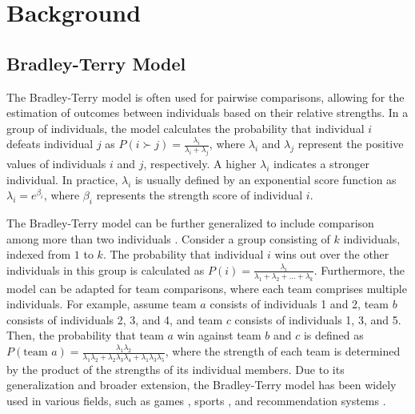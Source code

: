 \section{Background}
\label{sec:background}

\subsection{Bradley-Terry Model}
\label{subsec:bg_generalized_bt}
The Bradley-Terry model \citep{bradley_rank_1952} is often used for pairwise comparisons, allowing for the estimation of outcomes between individuals based on their relative strengths.
In a group of individuals, the model calculates the probability that individual $i$ defeats individual $j$ as $P(i \succ j) = \frac{\lambda_i}{\lambda_i+\lambda_j}$, where $\lambda_i$ and $\lambda_j$ represent the positive values of individuals $i$ and $j$, respectively.
A higher $\lambda_i$ indicates a stronger individual.
In practice, $\lambda_i$ is usually defined by an exponential score function as $\lambda_i=e^{\beta_i}$, where $\beta_i$ represents the strength score of individual $i$.

The Bradley-Terry model can be further generalized to include comparison among more than two individuals \citep{huang_generalized_2006}.
Consider a group consisting of $k$ individuals, indexed from $1$ to $k$.
The probability that individual $i$ wins out over the other individuals in this group is calculated as $P(i) = \frac{\lambda_i}{\lambda_1 + \lambda_2 + \ldots + \lambda_k}$.
Furthermore, the model can be adapted for team comparisons, where each team comprises multiple individuals.
For example, assume team $a$ consists of individuals 1 and 2, team $b$ consists of individuals 2, 3, and 4, and team $c$ consists of individuals 1, 3, and 5.
Then, the probability that team $a$ win against team $b$ and $c$ is defined as $P(\text{team }a) = \frac{\lambda_1\lambda_2}{\lambda_1\lambda_2 + \lambda_2\lambda_3\lambda_4 + \lambda_1\lambda_3\lambda_5}$, where the strength of each team is determined by the product of the strengths of its individual members.
Due to its generalization and broader extension, the Bradley-Terry model has been widely used in various fields, such as games \citep{coulom_computing_2007}, sports \citep{cattelan_dynamic_2013}, and recommendation systems \citep{chen_predicting_2016}.


